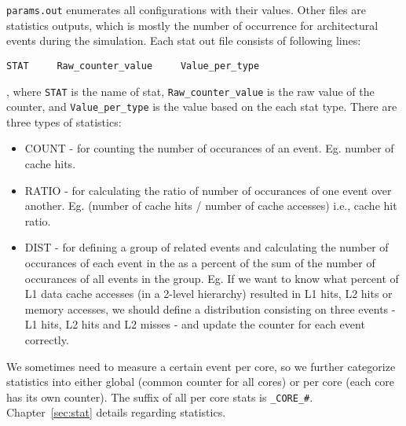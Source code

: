 \noindent
\Verb+params.out+ enumerates all configurations with their
values. Other files are statistics outputs, which is mostly the number
of occurrence for architectural events during the simulation. Each
stat out file consists of following lines:

\begin{Verbatim}
STAT     Raw_counter_value     Value_per_type
\end{Verbatim}

\noindent
, where \Verb+STAT+ is the name of stat, \Verb+Raw_counter_value+ is
the raw value of the counter, and \Verb+Value_per_type+ is the value
based on the each stat type. There are three types of statistics:

\begin{itemize}

  \item COUNT - for counting the number of occurances of an event. Eg. number
  of cache hits. 

  \item RATIO - for calculating the ratio of number of occurances of one event
  over another. Eg. (number of cache hits / number of cache accesses) i.e.,
  cache hit ratio.

  \item DIST - for defining a group of related events and calculating the
  number of occurances of each event in the as a percent of the sum of the
  number of occurances of all events in the group.  Eg. If we want to know what
  percent of L1 data cache accesses (in a 2-level hierarchy) resulted in L1
  hits, L2 hits or memory accesses, we should define a distribution consisting
  on three events - L1 hits, L2 hits and L2 misses  - and update the
  counter for each event correctly. 
\end{itemize}


\noindent
We sometimes need to measure a certain event per core, so we further
categorize statistics into either global (common counter for all
cores) or per core (each core has its own counter). The suffix of all
per core stats is \Verb+_CORE_#+. Chapter~\ref{sec:stat} details
regarding statistics.


